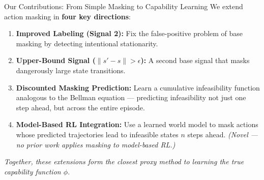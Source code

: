 \documentclass[11pt,aspectratio=169]{beamer}
\begin{document}
\begin{frame}{Our Contributions: From Simple Masking to Capability Learning}
    We extend action masking in \textbf{four key directions}:

    \vspace{0.3cm}
    \begin{enumerate}
        \item \textbf{Improved Labeling (Signal 2):} Fix the false-positive problem of base masking by detecting intentional stationarity.

        \vspace{0.15cm}
        \item \textbf{Upper-Bound Signal ($\|s' - s\| > \epsilon$):} A second base signal that masks dangerously large state transitions.

        \vspace{0.15cm}
        \item \textbf{Discounted Masking Prediction:} Learn a cumulative infeasibility function analogous to the Bellman equation — predicting infeasibility not just one step ahead, but across the entire episode.

        \vspace{0.15cm}
        \item \textbf{Model-Based RL Integration:} Use a learned world model to mask actions whose predicted trajectories lead to infeasible states $n$ steps ahead. \textit{(Novel — no prior work applies masking to model-based RL.)}
    \end{enumerate}

    \vspace{0.3cm}
    \textit{Together, these extensions form the closest proxy method to learning the true capability function $\phi$.}
\end{frame}
\end{document}

